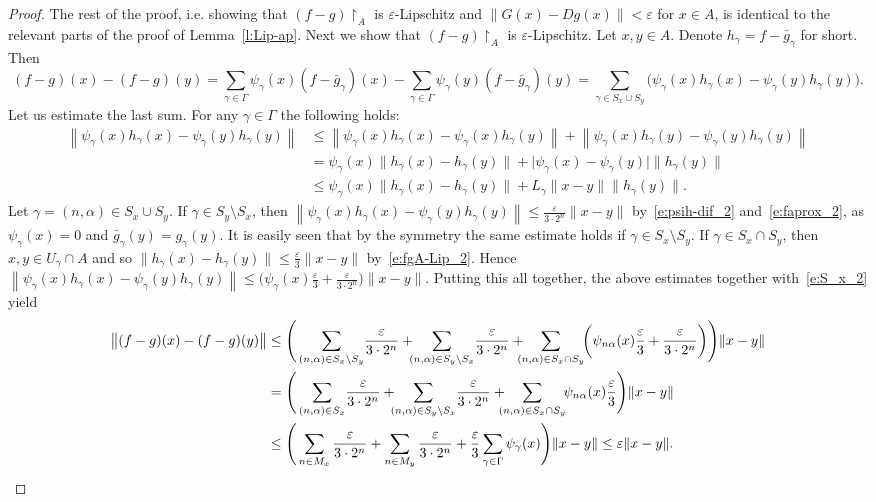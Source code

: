 \documentclass[a4paper,twoside,10pt,reqno,draft]{amsart}
\theoremstyle{definition}
\theoremstyle{remark}
\newcommand\abs[1]{\mathopen|#1\mathclose|}
\newcommand\norm[1]{\mathopen\|#1\mathclose\|}
\newcommand\norma[1]{\left\|#1\right\|}
\newcommand\normb[2]{\csname#1l\endcsname\|#2\csname#1r\endcsname\|}
\newcommand\al{\alpha}
\newcommand\ga{\gamma}
\newcommand\Ga{\Gamma}
\newcommand\ve{\varepsilon}
\newcommand\restr[1]{\mathclose\restriction_{#1}}
\begin{document}
\begin{proof}
The rest of the proof, i.e. showing that $(f-g)\restr A$ is $\ve$-Lipschitz and $\norm{G(x)-Dg(x)}<\ve$ for $x\in A$, is identical to the relevant parts of the proof of Lemma~\ref{l:Lip-ap}.
\iffalse%
Next we show that $(f-g)\restr A$ is $\ve$-Lipschitz.
Let $x,y\in A$.
Denote $h_\ga=f-\bar g_\ga$ for short.
Then
\[
(f-g)(x)-(f-g)(y)=\sum_{\ga\in\Ga}\psi_\ga(x)(f-\bar g_\ga)(x)-\sum_{\ga\in\Ga}\psi_\ga(y)(f-\bar g_\ga)(y)=\!\!\!\sum_{\ga\in S_x\cup S_y}\!\!\bigl(\psi_\ga(x)h_\ga(x)-\psi_\ga(y)h_\ga(y)\bigr).
\]
Let us estimate the last sum.
For any $\ga\in\Ga$ the following holds:
\begin{equation}\label{e:psih-dif_2}\begin{split}
\norma{\psi_\ga(x)h_\ga(x)-\psi_\ga(y)h_\ga(y)}&\le\norma{\psi_\ga(x)h_\ga(x)-\psi_\ga(x)h_\ga(y)}+\norma{\psi_\ga(x)h_\ga(y)-\psi_\ga(y)h_\ga(y)}\\
&=\psi_\ga(x)\norm{h_\ga(x)-h_\ga(y)}+\abs{\psi_\ga(x)-\psi_\ga(y)}\norm{h_\ga(y)}\\
&\le\psi_\ga(x)\norm{h_\ga(x)-h_\ga(y)}+L_\ga\norm{x-y}\norm{h_\ga(y)}.
\end{split}\end{equation}
Let $\ga=(n,\al)\in S_x\cup S_y$.
If $\ga\in S_y\setminus S_x$, then $\norma{\psi_\ga(x)h_\ga(x)-\psi_\ga(y)h_\ga(y)}\le\frac\ve{3\cdot 2^n}\norm{x-y}$ by~\eqref{e:psih-dif_2} and~\eqref{e:faprox_2}, as $\psi_\ga(x)=0$ and $\bar g_\ga(y)=g_\ga(y)$.
It is easily seen that by the symmetry the same estimate holds if $\ga\in S_x\setminus S_y$.
If $\ga\in S_x\cap S_y$, then $x,y\in U_\ga\cap A$ and so $\norm{h_\ga(x)-h_\ga(y)}\le\frac\ve3\norm{x-y}$ by~\eqref{e:fgA-Lip_2}.
Hence $\norma{\psi_\ga(x)h_\ga(x)-\psi_\ga(y)h_\ga(y)}\le\bigl(\psi_\ga(x)\frac\ve3+\frac\ve{3\cdot 2^n}\bigr)\norm{x-y}$.
Putting this all together, the above estimates together with~\eqref{e:S_x_2} yield
\[\begin{split}
\normb{big}{(f-g)(x)-(f-g)(y)}&\le\Biggl(\,\sum_{(n,\al)\in S_x\setminus S_y}\!\frac\ve{3\cdot 2^n}+\!\!\!\sum_{(n,\al)\in S_y\setminus S_x}\!\frac\ve{3\cdot 2^n}+\!\!\!\!\sum_{(n,\al)\in S_x\cap S_y}\!\biggl(\psi_{n\al}(x)\frac\ve3+\frac\ve{3\cdot 2^n}\biggr)\Biggr)\norm{x-y}\\
&=\Biggl(\,\sum_{(n,\al)\in S_x}\!\frac\ve{3\cdot 2^n}+\!\!\!\sum_{(n,\al)\in S_y\setminus S_x}\!\frac\ve{3\cdot 2^n}+\!\!\!\!\sum_{(n,\al)\in S_x\cap S_y}\!\!\psi_{n\al}(x)\frac\ve3\Biggr)\norm{x-y}\\
&\le\Biggl(\,\sum_{n\in M_x}\frac\ve{3\cdot 2^n}+\sum_{n\in M_y}\frac\ve{3\cdot 2^n}+\frac\ve3\sum_{\ga\in\Ga}\psi_\ga(x)\Biggr)\norm{x-y}\le\ve\norm{x-y}.
\end{split}\]


\end{proof}
\end{document}
